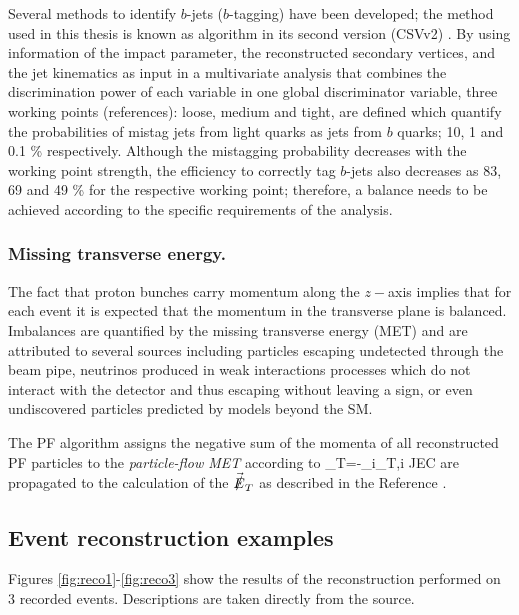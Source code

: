 Several methods to identify $b$-jets ($b$-tagging) have been developed; the method used in this thesis is known as  algorithm in its second version (CSVv2) \cite{btag}. By using information of the impact parameter, the reconstructed secondary vertices, and the jet kinematics as input in a multivariate analysis that combines the discrimination power of each variable in one global discriminator variable, three working points (references): loose, medium and tight, are defined which quantify the probabilities of mistag jets from light quarks as jets from $b$ quarks; 10, 1 and 0.1 \% respectively. Although the mistagging probability decreases with the working point strength, the efficiency to correctly tag $b$-jets also decreases as 83, 69 and 49 \% for the respective working point; therefore, a balance needs to be achieved according to the specific requirements of the analysis.

\subsubsection*{Missing transverse energy.}\label{sssec:met}

The fact that proton bunches carry momentum along the $z-$axis implies that for each event it is expected that the momentum in the transverse plane is balanced. Imbalances are quantified by the missing transverse energy (MET) and are attributed to several sources including particles escaping undetected through the beam pipe, neutrinos produced in weak interactions processes which do not interact with the detector and thus escaping without leaving a sign, or even undiscovered particles predicted by models beyond the SM.

The PF algorithm assigns the negative sum of the momenta of all reconstructed PF particles to the \textit{particle-flow MET} according to
\beqn
{}_T=-\sum_{i}_{T,i}
\eeqn
JEC are propagated to the calculation of the $\vec{\slashed{E}}_T$ as described in the Reference \cite{metcorr}.

\subsection{Event reconstruction examples}

Figures \ref{fig:reco1}-\ref{fig:reco3} show the results of the reconstruction performed on 3 recorded events. Descriptions are taken directly from the source.

